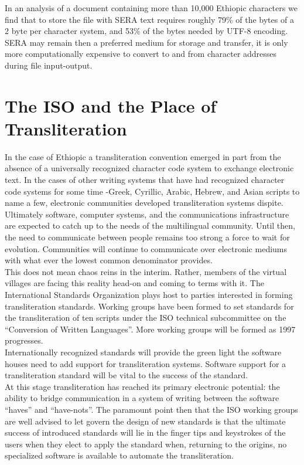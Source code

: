 In an analysis of a document containing more than 10,000 Ethiopic
characters we find that to store the file with SERA text requires roughly 79\%
of the bytes of a 2 byte per character system, and 53\% of the bytes needed
by UTF-8 encoding.  SERA may remain then a preferred medium for storage and
transfer, it is only more computationally expensive to convert to and from
character addresses during file input-output.\\


\section*{The ISO and the Place of Transliteration}

In the case of Ethiopic a transliteration convention emerged in part from
the absence of a universally recognized character code system to exchange 
electronic text.  In the cases of other writing systems that have had recognized
character code systems for some time -Greek, Cyrillic, Arabic, Hebrew, and Asian
scripts to name a few, electronic communities developed transliteration systems
dispite.\\

Ultimately software, computer systems, and the communications infrastructure
are expected to catch up to the needs of the multilingual community.  Until
then, the need to communicate between people remains too strong a force 
to wait for evolution.  Communities will continue to communicate over
electronic mediums with what ever the lowest common denominator provides.\\

This does not mean chaos reins in the interim.  Rather, members of the virtual
villages are facing this reality head-on and coming to terms with it.  The
International Standards Organization plays host to parties interested in
forming transliteration standards.  Working groups have been formed to set
standards for the transliteration of ten scripts under the ISO technical
subcommittee on the ``Conversion of Written Languages''.  More working groups
will be formed as 1997 progresses.\\

Internationally recognized standards will provide the green light
the software houses need to add support for transliteration systems.  Software
support for a transliteration standard will be vital to the success of the
standard.  \\

At this stage transliteration has reached its primary electronic potential:
the ability to bridge communication in a system of writing between the
software ``haves'' and ``have-nots''.  The paramount point then that the ISO
working groups are well advised to let govern the design of new standards
is that the ultimate success of introduced standards will lie in the finger
tips and keystrokes of the users when they elect to apply the standard when,
returning to the origins,
no specialized software is available to automate the transliteration.
